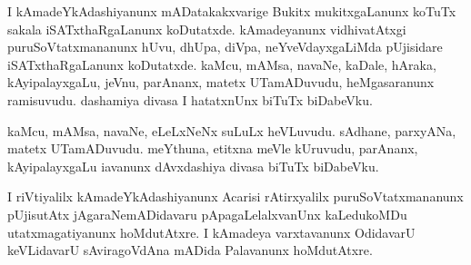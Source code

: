\documentclass{article}
\begin{document}
\begin{mn}%
I kAmadeYkAdashiyanunx mADatakakxvarige Bukitx mukitxgaLanunx koTuTx sakala iSATxthaRgaLanunx 
koDutatxde. kAmadeyanunx vidhivatAtxgi puruSoVtatxmananunx hUvu, dhUpa, diVpa, neYveVdayxgaLiMda 
pUjisidare iSATxthaRgaLanunx koDutatxde. kaMcu, mAMsa, navaNe, kaDale, hAraka, kAyipalayxgaLu, 
jeVnu, parAnanx, matetx UTamADuvudu, heMgasaranunx ramisuvudu. dashamiya divasa I hatatxnUnx 
biTuTx biDabeVku.
\end{mn}

\begin{mn}%
kaMcu, mAMsa, navaNe, eLeLxNeNx suLuLx heVLuvudu. sAdhane, parxyANa, matetx UTamADuvudu. meYthuna, 
etitxna meVle kUruvudu, parAnanx, kAyipalayxgaLu iavanunx dAvxdashiya divasa biTuTx biDabeVku.
\end{mn}

\begin{mn}%
I riVtiyalilx kAmadeYkAdashiyanunx Acarisi rAtirxyalilx puruSoVtatxmananunx pUjisutAtx 
jAgaraNemADidavaru pApagaLelalxvanUnx kaLedukoMDu utatxmagatiyanunx hoMdutAtxre. I kAmadeya 
varxtavanunx OdidavarU keVLidavarU sAviragoVdAna mADida Palavanunx hoMdutAtxre.
\end{mn}

\end{document}
